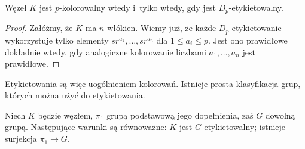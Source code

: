 \begin{proposition}
    Węzeł $K$ jest $p$-kolorowalny wtedy i~tylko wtedy, gdy jest $D_p$-etykietowalny.
\end{proposition}

\begin{proof}
    Załóżmy, że $K$ ma $n$ włókien.
    Wiemy już, że każde $D_p$-etykietowanie wykorzystuje tylko elementy $sr^{a_1}, \ldots, sr^{a_n}$ dla $1 \le a_i \le p$.
    Jest ono prawidłowe dokładnie wtedy, gdy analogiczne kolorowanie liczbami $a_1, \ldots, a_n$ jest prawidłowe.
\end{proof}

Etykietowania są więc uogólnieniem kolorowań.
Istnieje prosta klasyfikacja grup, których można użyć do etykietowania.

\begin{proposition}
    Niech $K$ będzie węzłem, $\pi_1$ grupą podstawową jego dopełnienia, zaś $G$ dowolną grupą.
    Następujące warunki są równoważne: $K$ jest $G$-etykietowalny; istnieje surjekcja $\pi_1 \to G$.
\end{proposition}


